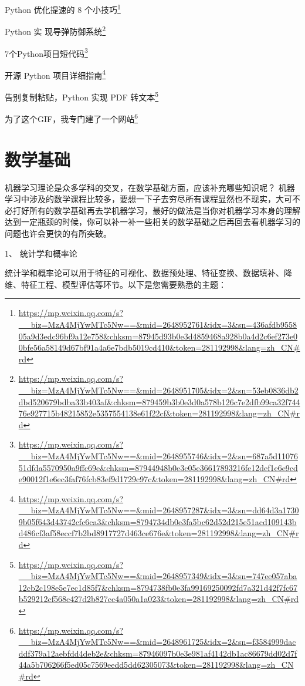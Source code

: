 \documentclass[]{ctexbook}
\renewcommand{\href}[2]{#2\footnote{\url{#1}}}
\begin{document}
\href{https://mp.weixin.qq.com/s?__biz=MzA4MjYwMTc5Nw==\&mid=2648952761\&idx=3\&sn=436afdb955805a9d3edc96bf9a12e758\&chksm=87945d93b0e3d4859468a928b0a4d2c6ef273e00bfe56a58149d67bf91a4a6e7bdb5019cd410\&token=281192998\&lang=zh_CN\#rd}{Python 优化提速的 8 个小技巧}

\href{https://mp.weixin.qq.com/s?__biz=MzA4MjYwMTc5Nw==\&mid=2648951705\&idx=2\&sn=53eb0836db2dbd520679bdba33b403af\&chksm=879459b3b0e3d0a578b126c7e2dfb99ca32f74476e927715b48215852e5357554138e61f22cf\&token=281192998\&lang=zh_CN\#rd}{Python 实 现导弹防御系统}

\href{https://mp.weixin.qq.com/s?__biz=MzA4MjYwMTc5Nw==\&mid=2648955746\&idx=2\&sn=687a5d1107651dfda5570950a9ffc69e\&chksm=87944948b0e3c05e36617893216fe12def1e6e9cde90012f1e6ec3faf76fcb83ef9d1729c97c\&token=281192998\&lang=zh_CN\#rd}{7个Python项目短代码}

\href{https://mp.weixin.qq.com/s?__biz=MzA4MjYwMTc5Nw==\&mid=2648957287\&idx=3\&sn=dd64d3a17309b05f643d43742cfc6ca3\&chksm=8794734db0e3fa5bc62d52d215e51acd109143bd486cf3af58eccf7b2bd8917727d463ce676e\&token=281192998\&lang=zh_CN\#rd}{开源 Python 项目详细指南}

\href{https://mp.weixin.qq.com/s?__biz=MzA4MjYwMTc5Nw==\&mid=2648957349\&idx=3\&sn=747ee057aba12cb2c198e5e7ec1d85f7\&chksm=8794738fb0e3fa99169250092fd7a321d42f7fc67b529212cf568c427d2b827cc4a050a1a023\&token=281192998\&lang=zh_CN\#rd}{告别复制粘贴，Python 实现 PDF 转文本}

\href{https://mp.weixin.qq.com/s?__biz=MzA4MjYwMTc5Nw==\&mid=2648961725\&idx=2\&sn=f3584999dacddf379a12aebfdd4deb2e\&chksm=87946097b0e3e981af4142db1ac86679dd02d7f44a5b706266f5ed05c7569eedd5dd62305073\&token=281192998\&lang=zh_CN\#rd}{为了这个GIF，我专门建了一个网站}

\hypertarget{ux6570ux5b66ux57faux7840}{%
\chapter{数学基础}\label{ux6570ux5b66ux57faux7840}}

机器学习理论是众多学科的交叉，在数学基础方面，应该补充哪些知识呢？
机器学习中涉及的数学课程比较多，要想一下子去穷尽所有课程显然也不现实，大可不必打好所有的数学基础再去学机器学习，最好的做法是当你对机器学习本身的理解达到一定瓶颈的时候，你可以补一补一些相关的数学基础之后再回去看机器学习的问题也许会更快的有所突破。

1、 统计学和概率论

统计学和概率论可以用于特征的可视化、数据预处理、特征变换、数据填补、降维、特征工程、模型评估等环节。以下是您需要熟悉的主题：
\end{document}
